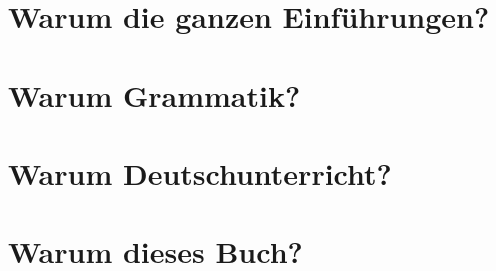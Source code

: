 \addchap{\lsPrefaceTitle}

\section*{Warum die ganzen Einführungen?}

\section*{Warum Grammatik?}

\section*{Warum Deutschunterricht?}

\section*{Warum dieses Buch?}

